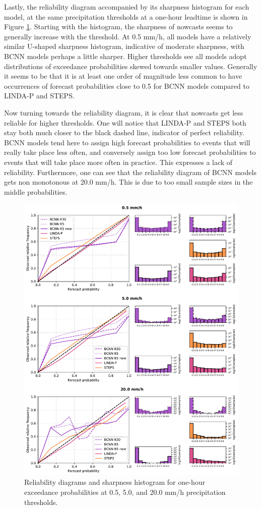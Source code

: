 Lastly, the reliability diagram accompanied by its sharpness histogram for each model, at the same precipitation thresholds at a one-hour leadtime is shown in Figure \ref{fig:reldiag}. Starting with the histogram, the sharpness of nowcasts seems to generally increase with the threshold. At 0.5 mm/h, all models have a relatively similar U-shaped sharpness histogram, indicative of moderate sharpness, with BCNN models perhaps a little sharper. Higher thresholds see all models adopt distributions of exceedance probabilities skewed towards smaller values. Generally it seems to be that it is at least one order of magnitude less common to have occurrences of forecast probabilities close to 0.5 for BCNN models compared to LINDA-P and STEPS.

Now turning towards the reliability diagram, it is clear that nowcasts get less reliable for higher thresholds. One will notice that LINDA-P and STEPS both stay both much closer to the black dashed line, indicator of perfect reliability. BCNN models tend here to assign high forecast probabilities to events that will really take place less often, and conversely assign too low forecast probabilities to events that will take place more often in practice. This expresses a lack of reliability. Furthermore, one can see that the reliability diagram of BCNN models gets non monotonous at 20.0 mm/h. This is due to too small sample sizes in the middle probabilities.

 
 \begin{figure}[H]
 	\includegraphics[width=\linewidth]{images/metrics/RELDIAG_together}
 	\caption{Reliability diagrams and sharpness histogram for one-hour exceedance probabilities at 0.5, 5.0, and 20.0 mm/h precipitation thresholds.}
 	\label{fig:reldiag}
 \end{figure}
